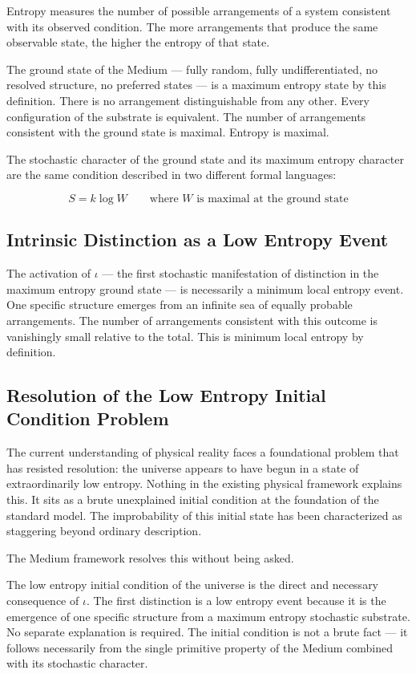 \documentclass[11pt]{article}
\begin{document}
Entropy measures the number of possible arrangements of a system consistent with
its observed condition. The more arrangements that produce the same observable
state, the higher the entropy of that state.

The ground state of the Medium — fully random, fully undifferentiated, no
resolved structure, no preferred states — is a maximum entropy state by this
definition. There is no arrangement distinguishable from any other. Every
configuration of the substrate is equivalent. The number of arrangements
consistent with the ground state is maximal. Entropy is maximal.

The stochastic character of the ground state and its maximum entropy character
are the same condition described in two different formal languages:

\begin{equation}
S = k \log W \qquad \text{where } W \text{ is maximal at the ground state}
\end{equation}
\subsection{Intrinsic Distinction as a Low Entropy Event}
\label{sec:org6cab2f4}

The activation of \(\iota\) — the first stochastic manifestation of distinction
in the maximum entropy ground state — is necessarily a minimum local entropy
event. One specific structure emerges from an infinite sea of equally probable
arrangements. The number of arrangements consistent with this outcome is
vanishingly small relative to the total. This is minimum local entropy by
definition.
\subsection{Resolution of the Low Entropy Initial Condition Problem}
\label{sec:org08c07da}

The current understanding of physical reality faces a foundational problem that
has resisted resolution: the universe appears to have begun in a state of
extraordinarily low entropy. Nothing in the existing physical framework explains
this. It sits as a brute unexplained initial condition at the foundation of the
standard model. The improbability of this initial state has been characterized
as staggering beyond ordinary description.

The Medium framework resolves this without being asked.

The low entropy initial condition of the universe is the direct and necessary
consequence of \(\iota\). The first distinction is a low entropy event because it
is the emergence of one specific structure from a maximum entropy stochastic
substrate. No separate explanation is required. The initial condition is not a
brute fact — it follows necessarily from the single primitive property of the
Medium combined with its stochastic character.
\end{document}
